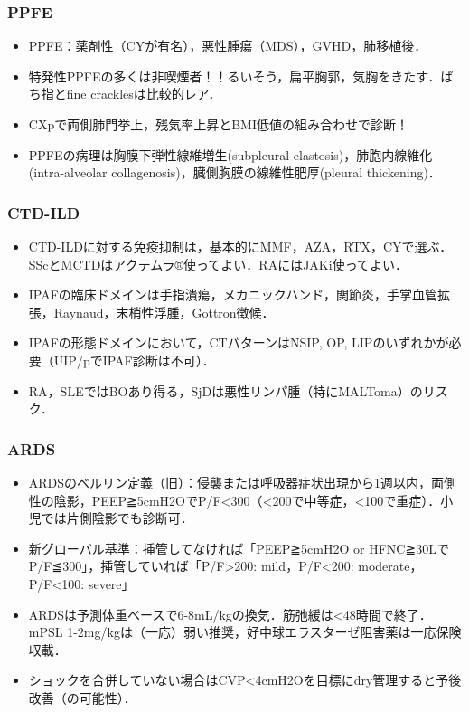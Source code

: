 \subsubsection{PPFE}
\begin{itemize}
\item PPFE：薬剤性（CYが有名），悪性腫瘍（MDS），GVHD，肺移植後．
\item 特発性PPFEの多くは非喫煙者！！るいそう，扁平胸郭，気胸をきたす．ばち指とfine cracklesは比較的レア．
\item CXpで両側肺門挙上，残気率上昇とBMI低値の組み合わせで診断！
\item PPFEの病理は胸膜下弾性線維増生(subpleural elastosis)，肺胞内線維化(intra-alveolar collagenosis)，臓側胸膜の線維性肥厚(pleural thickening)．
\end{itemize}


\subsubsection{CTD-ILD}
\begin{itemize}
\item CTD-ILDに対する免疫抑制は，基本的にMMF，AZA，RTX，CYで選ぶ．SScとMCTDはアクテムラ®使ってよい．RAにはJAKi使ってよい．
\item IPAFの臨床ドメインは手指潰瘍，メカニックハンド，関節炎，手掌血管拡張，Raynaud，末梢性浮腫，Gottron徴候．
\item IPAFの形態ドメインにおいて，CTパターンはNSIP, OP, LIPのいずれかが必要（UIP/pでIPAF診断は不可）．
\item RA，SLEではBOあり得る，SjDは悪性リンパ腫（特にMALToma）のリスク．
\end{itemize}


\subsubsection{ARDS}
\begin{itemize}
\item ARDSのベルリン定義（旧）：侵襲または呼吸器症状出現から1週以内，両側性の陰影，PEEP≧5cmH2OでP/F<300（<200で中等症，<100で重症）．小児では片側陰影でも診断可．
\item 新グローバル基準：挿管してなければ「PEEP≧5cmH2O or HFNC≧30LでP/F≦300」，挿管していれば「P/F>200: mild，P/F<200: moderate，P/F<100: severe」
\item ARDSは予測体重ベースで6-8mL/kgの換気．筋弛緩は<48時間で終了．mPSL 1-2mg/kgは（一応）弱い推奨，好中球エラスターゼ阻害薬は一応保険収載．
\item ショックを合併していない場合はCVP<4cmH2Oを目標にdry管理すると予後改善（の可能性）．
\end{itemize}


